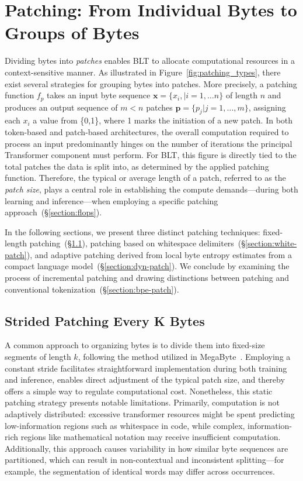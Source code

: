 \section{Patching: From Individual Bytes to Groups of Bytes}
\label{section:patching}

Dividing bytes into \textit{patches} enables {\textsc BLT} to allocate computational resources in a context-sensitive manner. As illustrated in Figure~\ref{fig:patching_types}, there exist several strategies for grouping bytes into patches. More precisely, a patching function $f_p$ takes an input byte sequence $\pmb{x}=\{x_i,|i=1,\ldots n\}$ of length $n$ and produces an output sequence of $m < n$ patches $\pmb{p}=\{p_j|j=1,\ldots,m\}$, assigning each $x_i$ a value from \{0,1\}, where 1 marks the initiation of a new patch. In both token-based and patch-based architectures, the overall computation required to process an input predominantly hinges on the number of iterations the principal Transformer component must perform. For {\textsc BLT}, this figure is directly tied to the total patches the data is split into, as determined by the applied patching function. Therefore, the typical or average length of a patch, referred to as the \textit{patch size}, plays a central role in establishing the compute demands—during both learning and inference—when employing a specific patching approach~(\S\ref{section:flops}). 

In the following sections, we present three distinct patching techniques: fixed-length patching~(\S\ref{section:static-patch}), patching based on whitespace delimiters~(\S\ref{section:white-patch}), and adaptive patching derived from local byte entropy estimates from a compact language model~(\S\ref{section:dyn-patch}). We conclude by examining the process of incremental patching and drawing distinctions between patching and conventional tokenization~(\S\ref{section:bpe-patch}).

\subsection{Strided Patching Every K Bytes}
\label{section:static-patch}

A common approach to organizing bytes is to divide them into fixed-size segments of length $k$, following the method utilized in MegaByte~\citep{yu2023megabyte}. Employing a constant stride facilitates straightforward implementation during both training and inference, enables direct adjustment of the typical patch size, and thereby offers a simple way to regulate computational cost. Nonetheless, this static patching strategy presents notable limitations. Primarily, computation is not adaptively distributed: excessive transformer resources might be spent predicting low-information regions such as whitespace in code, while complex, information-rich regions like mathematical notation may receive insufficient computation. Additionally, this approach causes variability in how similar byte sequences are partitioned, which can result in non-contextual and inconsistent splitting—for example, the segmentation of identical words may differ across occurrences.


